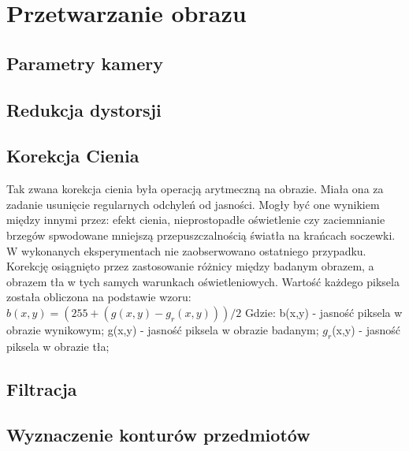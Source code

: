 \chapter{Przetwarzanie obrazu}
\label{cha:przetwarzanieObrazu}

\section{Parametry kamery}
\label{sec:parametryKamery}

\section{Redukcja dystorsji}
\label{sec:redukcjaDystorsji}

\section{Korekcja Cienia}
\label{sec:korekcjaCienia}

Tak zwana korekcja cienia była operacją arytmeczną na obrazie. Miała ona za zadanie usunięcie regularnych odchyleń od jasności. Mogły być one wynikiem między innymi przez: efekt cienia, nieprostopadłe oświetlenie czy zaciemnianie brzegów spwodowane mniejszą przepuszczalnością światła na krańcach soczewki. W wykonanych eksperymentach nie zaobserwowano ostatniego przypadku. Korekcję osiągnięto przez zastosowanie różnicy między badanym obrazem, a obrazem tła w tych samych warunkach oświetleniowych. Wartość każdego piksela została obliczona na podstawie wzoru:
$b(x,y) = (255 + ( g(x,y) - g_r(x, y) ) ) / 2$
Gdzie: 
b(x,y) - jasność piksela w obrazie wynikowym;
g(x,y) - jasność piksela w obrazie badanym;
$g_r$(x,y) - jasność piksela w obrazie tła;

\section{Filtracja}
\label{sec:filtracja}

\section{Wyznaczenie konturów przedmiotów}
\label{sec:wyznaczenieKonturow}


